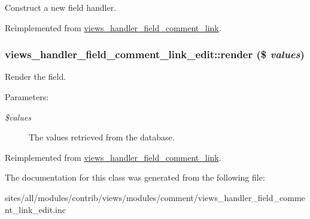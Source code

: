 Construct a new field handler. 

Reimplemented from \hyperlink{classviews__handler__field__comment__link_11c7fcae5ff5f91fa48fc1581115869b}{views\_\-handler\_\-field\_\-comment\_\-link}.\hypertarget{classviews__handler__field__comment__link__edit_e48ccec698d22ef50b68d4fd48ed1676}{
\subsubsection[{render}]{\setlength{\rightskip}{0pt plus 5cm}views\_\-handler\_\-field\_\-comment\_\-link\_\-edit::render (\$ {\em values})}}
\label{classviews__handler__field__comment__link__edit_e48ccec698d22ef50b68d4fd48ed1676}


Render the field.

\begin{Desc}
\item[Parameters:]
\begin{description}
\item[{\em \$values}]The values retrieved from the database. \end{description}
\end{Desc}


Reimplemented from \hyperlink{classviews__handler__field__comment__link_c5e8317cc1a0b2a7688f865662b27dae}{views\_\-handler\_\-field\_\-comment\_\-link}.

The documentation for this class was generated from the following file:\begin{CompactItemize}
\item 
sites/all/modules/contrib/views/modules/comment/views\_\-handler\_\-field\_\-comment\_\-link\_\-edit.inc\end{CompactItemize}
